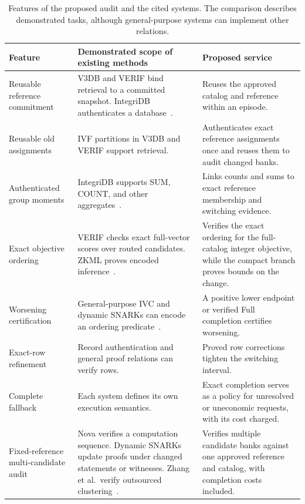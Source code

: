 \documentclass[5p,times,twocolumn]{elsarticle}
\begin{document}
\begin{table}[!t]
\centering\small
\caption{Features of the proposed audit and the cited systems. The
comparison describes demonstrated tasks, although general-purpose systems
can implement other relations.}
\label{tab:style-position-features}
\begin{tabularx}{\textwidth}{@{}p{}*{2}{>{\raggedright\arraybackslash}X}@{}}\toprule
Feature & Demonstrated scope of existing methods & Proposed service\\\midrule
Reusable reference commitment & V3DB and VERIF bind retrieval to a committed snapshot. IntegriDB authenticates a database~\cite{v3db2026,zhang2026verif,zhang2015integridb}. & Reuses the approved catalog and reference within an episode.\\
\addlinespace[2pt]
Reusable old assignments & IVF partitions in V3DB and VERIF support retrieval. & Authenticates exact reference assignments once and reuses them to audit changed banks.\\
\addlinespace[2pt]
Authenticated group moments & IntegriDB supports SUM, COUNT, and other aggregates~\cite{zhang2015integridb}. & Links counts and sums to exact reference membership and switching evidence.\\
\addlinespace[2pt]
Exact objective ordering & VERIF checks exact full-vector scores over routed candidates. ZKML proves encoded inference~\cite{zhang2026verif,chen2024zkml}. & Verifies the exact ordering for the full-catalog integer objective, while the compact branch proves bounds on the change.\\
\addlinespace[2pt]
Worsening certification & General-purpose IVC and dynamic SNARKs can encode an ordering predicate~\cite{kothapalli2022nova,wang2024dynamic,zhang2026dynark}. & A positive lower endpoint or verified Full completion certifies worsening.\\
\addlinespace[2pt]
Exact-row refinement & Record authentication and general proof relations can verify rows. & Proved row corrections tighten the switching interval.\\
\addlinespace[2pt]
Complete fallback & Each system defines its own execution semantics. & Exact completion serves as a policy for unresolved or uneconomic requests, with its cost charged.\\
\addlinespace[2pt]
Fixed-reference multi-candidate audit & Nova verifies a computation sequence. Dynamic SNARKs update proofs under changed statements or witnesses. Zhang et al.\ verify outsourced clustering~\cite{kothapalli2022nova,wang2024dynamic,zhang2026dynark,zhang2021verifiable}. & Verifies multiple candidate banks against one approved reference and catalog, with completion costs included.\\
\bottomrule
\end{tabularx}
\end{table}
\end{document}
